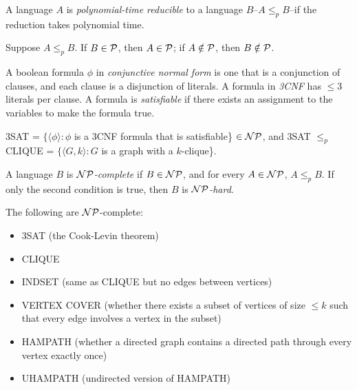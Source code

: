 \begin{definition}
A language $A$ is \emph{polynomial-time reducible} to a language $B$--$A \le_p B$--if the reduction takes polynomial time.
\end{definition}

\begin{theorem}
Suppose $A \le_p B$. If $B \in \mathcal{P}$, then $A \in \mathcal{P}$; if $A \notin \mathcal{P}$, then $B \notin \mathcal{P}$.
\end{theorem}

\begin{definition}
A boolean formula $\phi$ in \emph{conjunctive normal form} is one that is a conjunction of clauses, and each clause is a disjunction of literals. A formula in \emph{3CNF} has $\le 3$ literals per clause. A formula is \emph{satisfiable} if there exists an assignment to the variables to make the formula true.
\end{definition}

\begin{theorem}
3SAT = $\{\langle \phi \rangle : \phi$ is a 3CNF formula that is satisfiable\} $\in \mathcal{NP}$, and 3SAT $\le_p$ CLIQUE = $\{\langle G, k\rangle : G$ is a graph with a $k$-clique\}.
\end{theorem}

\begin{definition}
A language $B$ is \emph{$\mathcal{NP}$-complete} if $B \in \mathcal{NP}$, and for every $A \in \mathcal{NP}$, $A \le_p B$. If only the second condition is true, then $B$ is \emph{$\mathcal{NP}$-hard}.
\end{definition}

\begin{theorem}
The following are $\mathcal{NP}$-complete:
\begin{itemize}
\item 3SAT (the Cook-Levin theorem)
\item CLIQUE
\item INDSET (same as CLIQUE but no edges between vertices)
\item VERTEX COVER (whether there exists a subset of vertices of size $\le k$ such that every edge involves a vertex in the subset)
\item HAMPATH (whether a directed graph contains a directed path through every vertex exactly once)
\item UHAMPATH (undirected version of HAMPATH)
\end{itemize}
\end{theorem}

